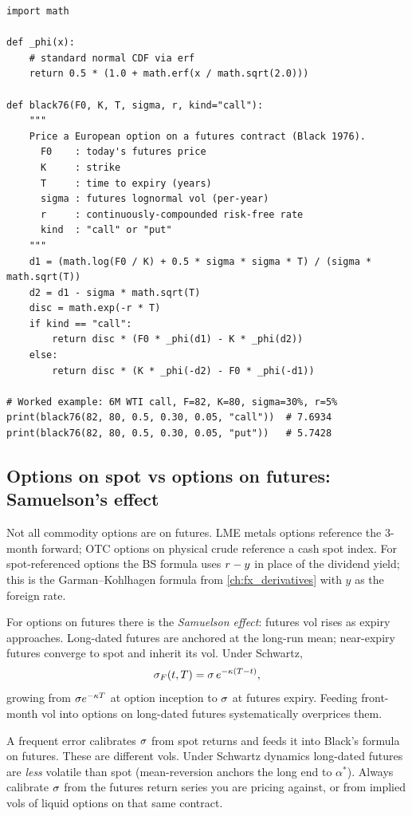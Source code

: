 \begin{lstlisting}[caption={Black's 1976 formula for European options on futures.}]
import math

def _phi(x):
    # standard normal CDF via erf
    return 0.5 * (1.0 + math.erf(x / math.sqrt(2.0)))

def black76(F0, K, T, sigma, r, kind="call"):
    """
    Price a European option on a futures contract (Black 1976).
      F0    : today's futures price
      K     : strike
      T     : time to expiry (years)
      sigma : futures lognormal vol (per-year)
      r     : continuously-compounded risk-free rate
      kind  : "call" or "put"
    """
    d1 = (math.log(F0 / K) + 0.5 * sigma * sigma * T) / (sigma * math.sqrt(T))
    d2 = d1 - sigma * math.sqrt(T)
    disc = math.exp(-r * T)
    if kind == "call":
        return disc * (F0 * _phi(d1) - K * _phi(d2))
    else:
        return disc * (K * _phi(-d2) - F0 * _phi(-d1))

# Worked example: 6M WTI call, F=82, K=80, sigma=30%, r=5%
print(black76(82, 80, 0.5, 0.30, 0.05, "call"))  # 7.6934
print(black76(82, 80, 0.5, 0.30, 0.05, "put"))   # 5.7428
\end{lstlisting}

\subsection{Options on spot vs options on futures: Samuelson's effect}

Not all commodity options are on futures.  LME metals options
reference the 3-month forward; OTC options on physical crude
reference a cash spot index.  For spot-referenced options the BS
formula uses $r - y$ in place of the dividend yield; this is the
Garman--Kohlhagen formula from \cref{ch:fx_derivatives} with $y$ as
the foreign rate.

For options on futures there is the \emph{Samuelson effect}:
futures vol rises as expiry approaches.  Long-dated futures are
anchored at the long-run mean; near-expiry futures converge to
spot and inherit its vol.  Under Schwartz,
\[
  \sigma_F(t,T) = \sigma\, e^{-\kappa(T-t)},
\]
growing from $\sigma e^{-\kappa T}$ at option inception to
$\sigma$ at futures expiry.  Feeding front-month vol into options
on long-dated futures systematically overprices them.

\begin{pitfallbox}
A frequent error calibrates $\sigma$ from spot returns and feeds it
into Black's formula on futures.  These are different vols.  Under
Schwartz dynamics long-dated futures are \emph{less} volatile than
spot (mean-reversion anchors the long end to $\alpha^*$).  Always
calibrate $\sigma$ from the futures return series you are pricing
against, or from implied vols of liquid options on that same
contract.
\end{pitfallbox}


